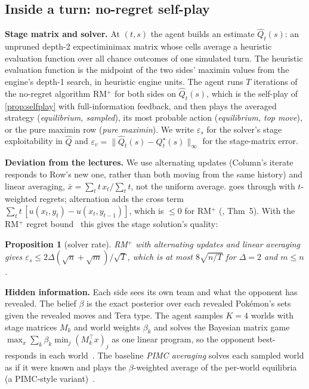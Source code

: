 \documentclass[10pt]{article}
\theoremstyle{plain}
\newtheorem{proposition}[theorem]{Proposition}
\theoremstyle{definition}
\theoremstyle{remark}
\newcommand{\epss}{\varepsilon_s}
\newcommand{\epsv}{\varepsilon_v}
\newcommand{\Qhat}{\hat Q}
\newcommand{\Qstar}{Q^\star}
\begin{document}
\subsection{Inside a turn: no-regret self-play}
\label{sec:inside}
\textbf{Stage matrix and solver.} At $(t,s)$ the agent builds an estimate $\Qhat_t(s)$: an unpruned depth-2 expectiminimax matrix whose cells average a heuristic evaluation function over all chance outcomes of one simulated turn. The heuristic evaluation function is the midpoint of the two sides' maximin values from the engine's depth-1 search, in heuristic engine units. The agent runs $T$ iterations of the no-regret algorithm RM$^+$ for both sides on $\Qhat_t(s)$, which is the self-play of \cref{prop:selfplay} with full-information feedback, and then plays the averaged strategy (\emph{equilibrium, sampled}), its most probable action (\emph{equilibrium, top move}), or the pure maximin row (\emph{pure maximin}). We write $\epss$ for the solver's stage exploitability in $\Qhat$ and $\epsv=\lVert\Qhat_t(s)-\Qstar_t(s)\rVert_\infty$ for the stage-matrix error.

\textbf{Deviation from the lectures.} We use alternating updates (Column's iterate responds to Row's new one, rather than both moving from the same history) and linear averaging, $\bar x=\sum_tt\,x_t/\sum_tt$, not the uniform average.  goes through with $t$-weighted regrets; alternation adds the cross term $\sum_tt\,[u(x_t,y_t)-u(x_t,y_{t-1})]$, which is $\le0$ for RM$^+$ (\cite{BMS19}, Thm~5). With the RM$^+$ regret bound~\cite{Tam14} this gives the stage solution's quality:
\begin{proposition}[solver rate]\label{prop:rm}
RM$^+$ with alternating updates and linear averaging gives $\epss\le2\Delta(\sqrt n+\sqrt m)/\sqrt T$, which is at most $8\sqrt{n/T}$ for $\Delta=2$ and $m\le n$.
\end{proposition}

\textbf{Hidden information.} Each side sees its own team and what the opponent has revealed. The belief $\beta$ is the exact posterior over each revealed Pok\'emon's sets given the revealed moves and Tera type. The agent samples $K=4$ worlds with stage matrices $M_k$ and world weights $\beta_k$ and solves the Bayesian matrix game $\max_x\sum_k \beta_k\min_j(M_k^\top x)_j$ as one linear program, so the opponent best-responds in each world~\cite{Yu26}. The baseline \emph{PIMC averaging} solves each sampled world as if it were known and plays the $\beta$-weighted average of the per-world equilibria (a PIMC-style variant)~\cite{Lon10}.
\end{document}
